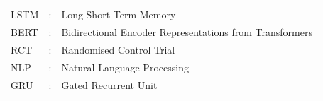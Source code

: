 \documentclass[12pt,a4paper]{report}     %
\begin{document}
\thispagestyle{empty}
\fancyhead{}
\renewcommand{\headrulewidth}{0pt}

\tableofcontents	 								%
\newpage
{\setlength{\baselineskip}{1.1\baselineskip}        %
\listoffigures
{}   %
}
\newpage
{\setlength{\baselineskip}{1.1\baselineskip}        %
\listoftables
{}
}
\newpage
		\begin{LARGE}
			\begin{flushleft}
				\section*{}
			\end{flushleft}
		\end{LARGE}
\begin{normalsize}
					\noindent
{\setlength{\baselineskip}{1.1\baselineskip}
\vspace{0.2 in}
\begin{tabular}{lll}
\vspace{0.1 in}
LSTM	&	:	&	Long Short Term Memory	\\
\vspace{0.1 in}
BERT	&	:	&	Bidirectional Encoder Representations from Transformers\\
\vspace{0.1 in}
RCT	&	:	&	Randomised Control Trial 	\\
\vspace{0.1 in}
NLP	&	:	&	Natural Language Processing 	\\
\vspace{0.1 in}
GRU	&	:	&	Gated Recurrent Unit 	\\
\end{tabular}
\par}
\end{normalsize}

\newpage
\pagestyle{fancy}							%
\renewcommand{\headrulewidth}{0.5pt}
\fancyhead[LO]	{}											 %
\renewcommand{\footrulewidth}{0.5pt}		%
\end{document}
